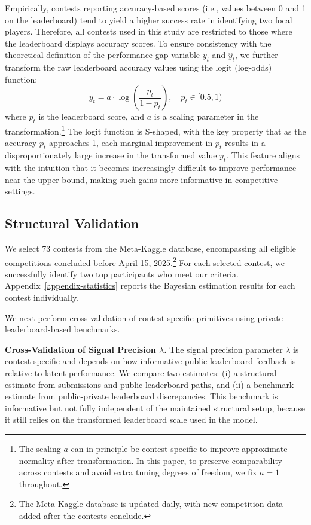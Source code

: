 \documentclass[mnsc]{informs3}
\begin{document}
Empirically, contests reporting accuracy-based scores (i.e., values between 0 and 1 on the leaderboard) tend to yield a higher success rate in identifying two focal players.
Therefore, all contests used in this study are restricted to those where the leaderboard displays accuracy scores.
To ensure consistency with the theoretical definition of the performance gap variable $y_t$ and $\hat{y}_t$, we further transform the raw leaderboard accuracy values using the logit (log-odds) function:
\begin{equation}\label{eq-leaderboard-transform}
y_t = a \cdot \log\left(\frac{p_t}{1-p_t}\right), \quad p_t\in[0.5, 1)
\end{equation}
where $p_t$ is the leaderboard score, and $a$ is a scaling parameter in the transformation.\footnote{
The scaling $a$ can in principle be contest-specific to improve approximate normality after transformation.
In this paper, to preserve comparability across contests and avoid extra tuning degrees of freedom, we fix $a=1$ throughout.
}
The logit function is S-shaped, with the key property that as the accuracy $p_t$ approaches 1, each marginal improvement in $p_t$ results in a disproportionately large increase in the transformed value $y_t$.
This feature aligns with the intuition that it becomes increasingly difficult to improve performance near the upper bound, making such gains more informative in competitive settings.


\subsection{Structural Validation}\label{sect-validation}


We select 73 contests from the Meta-Kaggle database, encompassing all eligible competitions concluded before April 15, 2025.\footnote{
The Meta-Kaggle database is updated daily, with new competition data added after the contests conclude.
}
For each selected contest, we successfully identify two top participants who meet our criteria.
Appendix~\ref{appendix-statistics} reports the Bayesian estimation results for each contest individually.

We next perform cross-validation of contest-specific primitives using private-leaderboard-based benchmarks.

\textbf{Cross-Validation of Signal Precision $\lambda$.}
The signal precision parameter $\lambda$ is contest-specific and depends on how informative public leaderboard feedback is relative to latent performance.
We compare two estimates: (i) a structural estimate from submissions and public leaderboard paths, and (ii) a benchmark estimate from public-private leaderboard discrepancies.
This benchmark is informative but not fully independent of the maintained structural setup, because it still relies on the transformed leaderboard scale used in the model.
\end{document}
